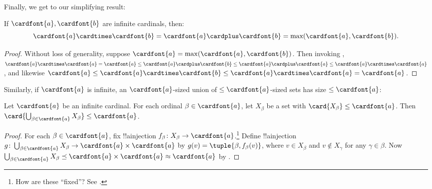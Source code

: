 \documentclass[../../../include/open-logic-section]{subfiles}
\begin{document}
Finally, we get to our simplifying result:

\begin{thm}
If $\cardfont{a}, \cardfont{b}$ are infinite cardinals, then:
\[
	\cardfont{a}
\cardtimes \cardfont{b} = \cardfont{a} \cardplus \cardfont{b} =
\text{max}(\cardfont{a}, \cardfont{b}).
\]
\end{thm}

\begin{proof}
Without loss of generality, suppose $\cardfont{a} = \max(\cardfont{a},
\cardfont{b})$. Then invoking ,
$\cardfont{a}\cardtimes\cardfont{a} = \cardfont{a} \leq \cardfont{a}
\cardplus \cardfont{b} \leq \cardfont{a} \cardplus \cardfont{a} \leq
\cardfont{a} \cardtimes \cardfont{a}$, and likewise $\cardfont{a} \leq
\cardfont{a} \cardtimes \cardfont{b} \leq \cardfont{a} \cardtimes \cardfont{a} = \cardfont{a}$. \end{proof}\noindent Similarly,
if $\cardfont{a}$ is infinite, an $\cardfont{a}$-sized union of
$\leq\cardfont{a}$-sized sets has size $\leq\cardfont{a}$:

\begin{prop}
Let $\cardfont{a}$ be an infinite cardinal. For each ordinal $\beta
\in \cardfont{a}$, let $X_\beta$ be a set with $\card{X_\beta} \leq
\cardfont{a}$. Then $\card{\bigcup_{\beta \in \cardfont{a}} X_\beta}
\leq \cardfont{a}$.
\end{prop}

\begin{proof}
For each $\beta \in \cardfont{a}$, fix !!a{injection} $f_\beta \colon
X_\beta \to \cardfont{a}$.\footnote{How are these ``fixed''? See .} Define !!a{injection} $g \colon
\bigcup_{\beta \in \cardfont{a}} X_\beta \to \cardfont{a} \times
\cardfont{a}$ by $g(v) = \tuple{\beta, f_\beta(v)}$, where $v \in
X_\beta$ and $v \notin X_\gamma$ for any $\gamma \in \beta$. Now
$\bigcup_{\beta \in \cardfont{a}} X_\beta \preceq \cardfont{a} \times
\cardfont{a} \approx \cardfont{a}$ by .
\end{proof}
\end{document}
